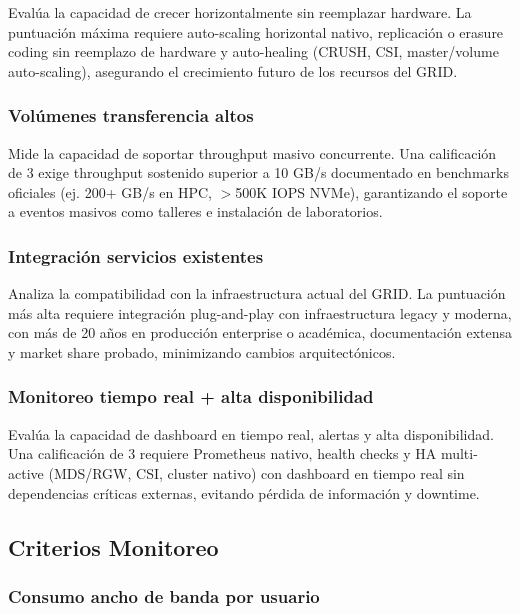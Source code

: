 Evalúa la capacidad de crecer horizontalmente sin reemplazar hardware. La puntuación máxima requiere auto-scaling horizontal nativo, replicación o erasure coding sin reemplazo de hardware y auto-healing (CRUSH, CSI, master/volume auto-scaling), asegurando el crecimiento futuro de los recursos del GRID.

\subsubsection{Volúmenes transferencia altos}

Mide la capacidad de soportar throughput masivo concurrente. Una calificación de 3 exige throughput sostenido superior a 10 GB/s documentado en benchmarks oficiales (ej. 200+ GB/s en HPC, $>$500K IOPS NVMe), garantizando el soporte a eventos masivos como talleres e instalación de laboratorios.

\subsubsection{Integración servicios existentes}

Analiza la compatibilidad con la infraestructura actual del GRID. La puntuación más alta requiere integración plug-and-play con infraestructura legacy y moderna, con más de 20 años en producción enterprise o académica, documentación extensa y market share probado, minimizando cambios arquitectónicos.

\subsubsection{Monitoreo tiempo real + alta disponibilidad}

Evalúa la capacidad de dashboard en tiempo real, alertas y alta disponibilidad. Una calificación de 3 requiere Prometheus nativo, health checks y HA multi-active (MDS/RGW, CSI, cluster nativo) con dashboard en tiempo real sin dependencias críticas externas, evitando pérdida de información y downtime.

\subsection{Criterios Monitoreo}

\subsubsection{Consumo ancho de banda por usuario}

